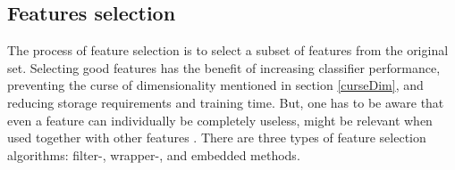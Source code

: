 \documentclass[USenglish]{ifimaster}  %
\begin{document}
\subsection{Features selection}\label{selection}	
The process of feature selection is to select a subset of features from the original set. Selecting good features has the benefit of increasing classifier performance, preventing the curse of dimensionality mentioned in section \ref{curseDim}, and reducing storage requirements and training time. But, one has to be aware that even a feature can individually be completely useless, might be relevant when used together with other features \cite{Guyon2006}. There are three types of feature selection algorithms: filter-, wrapper-, and embedded methods. %
	

	
\end{document}
